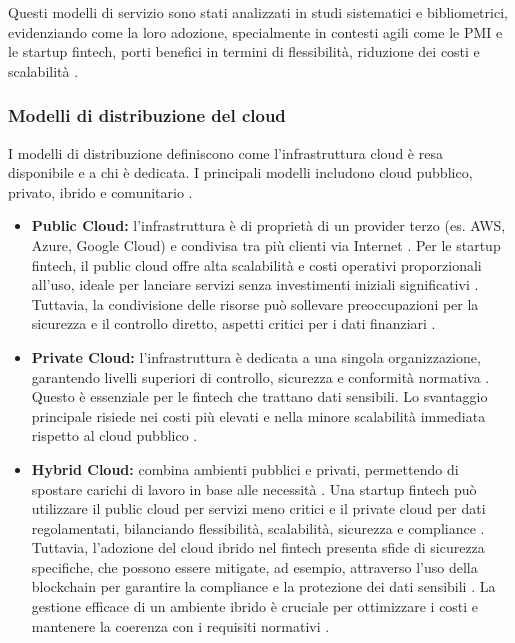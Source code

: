 Questi modelli di servizio sono stati analizzati in studi sistematici e bibliometrici, evidenziando come la loro adozione, specialmente in contesti agili come le PMI e le startup fintech, porti benefici in termini di flessibilità, riduzione dei costi e scalabilità \cite{vats2024systematic, hrmars2025cloud}.

\subsubsection{Modelli di distribuzione del cloud}

I modelli di distribuzione definiscono come l'infrastruttura cloud è resa disponibile e a chi è dedicata. I principali modelli includono cloud pubblico, privato, ibrido e comunitario \cite{maticmind2024hybrid, iso2018overview}.


\begin{itemize}
    \item \textbf{Public Cloud:} l'infrastruttura è di proprietà di un provider terzo (es. AWS, Azure, Google Cloud) e condivisa tra più clienti via Internet \cite{maticmind2024hybrid}. Per le startup fintech, il public cloud offre alta scalabilità e costi operativi proporzionali all'uso, ideale per lanciare servizi senza investimenti iniziali significativi \cite{maticmind2024hybrid}. Tuttavia, la condivisione delle risorse può sollevare preoccupazioni per la sicurezza e il controllo diretto, aspetti critici per i dati finanziari \cite{vats2024systematic, maticmind2024hybrid}.
    
    \item \textbf{Private Cloud:} l'infrastruttura è dedicata a una singola organizzazione, garantendo livelli superiori di controllo, sicurezza e conformità normativa \cite{maticmind2024hybrid}. Questo è essenziale per le fintech che trattano dati sensibili. Lo svantaggio principale risiede nei costi più elevati e nella minore scalabilità immediata rispetto al cloud pubblico \cite{maticmind2024hybrid}.
    
    \item \textbf{Hybrid Cloud:} combina ambienti pubblici e privati, permettendo di spostare carichi di lavoro in base alle necessità \cite{maticmind2024hybrid}. Una startup fintech può utilizzare il public cloud per servizi meno critici e il private cloud per dati regolamentati, bilanciando flessibilità, scalabilità, sicurezza e compliance \cite{maticmind2024hybrid}. Tuttavia, l'adozione del cloud ibrido nel fintech presenta sfide di sicurezza specifiche, che possono essere mitigate, ad esempio, attraverso l'uso della blockchain per garantire la compliance e la protezione dei dati sensibili \cite{urf2024security, vats2024systematic}. La gestione efficace di un ambiente ibrido è cruciale per ottimizzare i costi e mantenere la coerenza con i requisiti normativi \cite{maticmind2024hybrid}.
\end{itemize}

